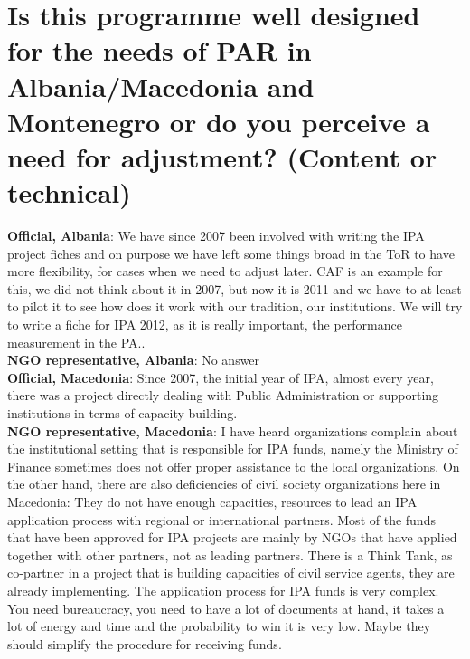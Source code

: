 \section{Is this programme well designed for the needs of PAR in Albania/Macedonia and Montenegro or do you perceive a need for adjustment? (Content or technical)}
\label{sec:par technical}
\textbf{Official, Albania}: We have since 2007 been involved with writing the IPA project fiches and on purpose we have left some things broad in the ToR to have more flexibility, for cases when we need to adjust later. CAF is an example for this, we did not think about it in 2007, but now it is 2011 and we have to at least to pilot it to see how does it work with our tradition, our institutions. We will try to write a fiche for IPA 2012, as it is really important, the performance measurement in the PA.. \\
\textbf{NGO representative, Albania}: No answer \\
\textbf{Official, Macedonia}: Since 2007, the initial year of IPA, almost every year, there was a project directly dealing with Public Administration or supporting institutions in terms of capacity building. \\
\textbf{NGO representative, Macedonia}: I have heard organizations complain about the institutional setting that is responsible for IPA funds, namely the Ministry of Finance sometimes does not offer proper assistance to the local organizations. On the other hand, there are also deficiencies of civil society organizations here in Macedonia: They do not have enough capacities, resources to lead an IPA application process with regional or international partners. Most of the funds that have been approved for IPA projects are mainly by NGOs that have applied together with other partners, not as leading partners. There is a Think Tank, as co-partner in a project that is building capacities of civil service agents, they are already implementing. The application process for IPA funds is very complex. You need bureaucracy, you need to have a lot of documents at hand, it takes a lot of energy and time and the probability to win it is very low. Maybe they should simplify the procedure for receiving funds. \\
